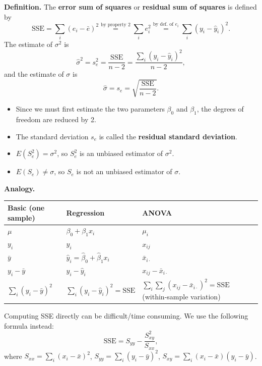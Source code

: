 \textbf{Definition.} The \textbf{error sum of squares} or \textbf{residual sum of squares} is defined by
\[
\mathrm{SSE}=\sum_i(e_i-\bar{e})^2 \overset{\text{by property 2}}{=} \sum_i e_i^2 \overset{\text{by def.\ of } e_i}{=} \sum_i(y_i-\hat{y}_i)^2 .
\]
The estimate of $\sigma^2$ is
\[
\hat\sigma^2=s_e^2=\frac{\mathrm{SSE}}{n-2}=\frac{\sum_i(y_i-\hat{y}_i)^2}{n-2},
\]
and the estimate of $\sigma$ is
\[
\hat\sigma=s_e=\sqrt{\frac{\mathrm{SSE}}{n-2}} .
\]
\begin{itemize}
  \item Since we must first estimate the two parameters $\beta_0$ and $\beta_1$, the degrees of freedom are reduced by 2.
  \item The standard deviation $s_e$ is called the \textbf{residual standard deviation}.
  \item $E(S_e^2)=\sigma^2$, so $S_e^2$ is an unbiased estimator of $\sigma^2$.
  \item $E(S_e)\ne\sigma$, so $S_e$ is not an unbiased estimator of $\sigma$.
\end{itemize}

\textbf{Analogy.}
\begin{center}
\begin{tabular}{lll}
\toprule
Basic (one sample) & Regression & ANOVA\\
\midrule
$\mu$ & $\beta_0+\beta_1x_i$ & $\mu_i$\\
$y_i$ & $y_i$ & $x_{ij}$\\
$\bar{y}$ & $\hat{y}_i=\hat\beta_0+\hat\beta_1x_i$ & $\bar{x}_{i\cdot}$\\
$y_i-\bar{y}$ & $y_i-\hat{y}_i$ & $x_{ij}-\bar{x}_{i\cdot}$\\
$\sum_i(y_i-\bar{y})^2$ & $\sum_i(y_i-\hat{y}_i)^2=\mathrm{SSE}$ & $\sum_i\sum_j(x_{ij}-\bar{x}_{i\cdot})^2=\mathrm{SSE}$ (within-sample variation)\\
\bottomrule
\end{tabular}
\end{center}

Computing SSE directly can be difficult/time consuming. We use the following formula instead:
\[
\mathrm{SSE}=S_{yy}-\frac{S_{xy}^2}{S_{xx}},
\]
where $S_{xx}=\sum_i(x_i-\bar{x})^2$, $S_{yy}=\sum_i(y_i-\bar{y})^2$, $S_{xy}=\sum_i(x_i-\bar{x})(y_i-\bar{y})$.

